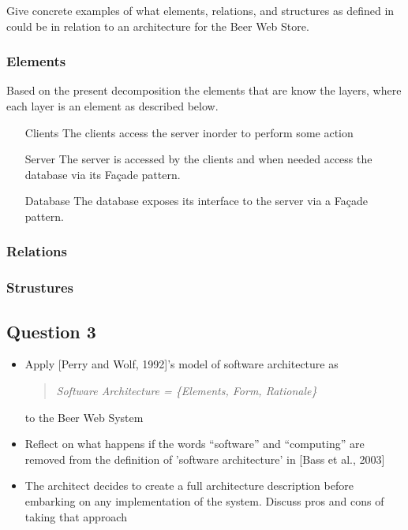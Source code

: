 \begin{question}
Give concrete examples of what elements, relations, and structures as defined in \cite{bass2003sa} could be in relation to an architecture for the Beer Web Store.
\end{question}
\subsubsection{Elements}
Based on the present decomposition the elements that are know the layers, where each layer is an element as described below.
\begin{itemize}
    \item[Clients] The clients access the server inorder to perform some action
    \item[Server] The server is accessed by the clients and when needed access the database via its Fa\c cade pattern.
    \item[Database] The database exposes its interface to the server via a Fa\c cade pattern.
\end{itemize}
\subsubsection{Relations}
\subsubsection{Strustures}
\subsection{Question 3}


\begin{itemize}
    \item Apply [Perry and Wolf, 1992]'s model of software architecture as
      \begin{quote}
	{\it Software Architecture = \{Elements, Form, Rationale\}}
      \end{quote}
      to the Beer Web System
    \item Reflect on what happens if the words ``software'' and
    ``computing'' are removed from the definition of 'software
    architecture' in [Bass et al., 2003]
    \item The architect decides to create a full architecture
    description before embarking on any implementation of the
    system. Discuss pros and cons of taking that approach
\end{itemize}
